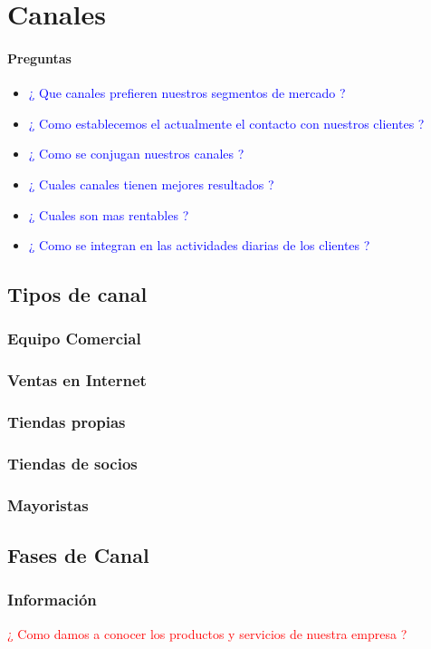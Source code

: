 \documentclass[11pt]{book}
\begin{document}
\chapter{Canales}

\subsubsection{Preguntas}
\begin{itemize}
\item\textcolor{blue}{¿ Que canales prefieren nuestros segmentos de mercado ? }
\item\textcolor{blue}{¿ Como establecemos el actualmente el contacto con nuestros clientes  ? }
\item\textcolor{blue}{¿ Como se conjugan nuestros canales ? }
\item\textcolor{blue}{¿ Cuales canales tienen mejores resultados ? }
\item\textcolor{blue}{¿ Cuales son mas rentables ? }
\item\textcolor{blue}{¿ Como se integran en las actividades diarias de los clientes ? }
\end{itemize}
\section{Tipos de canal}
\subsection{Equipo Comercial}
\subsection{Ventas en Internet}
\subsection{Tiendas propias}
\subsection{Tiendas de socios}
\subsection*{Mayoristas}
\section{Fases de Canal}
\subsection{Información}
\textcolor{red}{¿ Como damos a conocer los productos y servicios de nuestra empresa ?}
\end{document}
